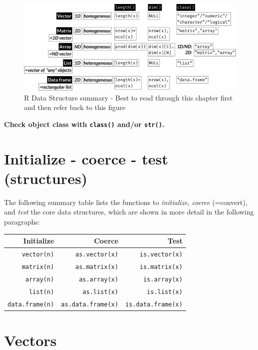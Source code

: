 \documentclass[
]{book}
\begin{document}
\begin{figure}

{\centering \includegraphics[width=1\linewidth]{./R_datastructures} 

}

\caption{R Data Structure summary - Best to read through this chapter first and then refer back to this figure}\label{fig:FigRDataStructures}
\end{figure}

\begin{rmdtip}
\textbf{Check object class with \texttt{class()} and/or \texttt{str()}.}
\end{rmdtip}

\hypertarget{initialize---coerce---test-structures}{%
\section{Initialize - coerce - test (structures)}\label{initialize---coerce---test-structures}}

The following summary table lists the functions to \emph{initialize}, \emph{coerce} (=convert), and \emph{test} the core data structures, which are shown in more detail in the following paragraphs:

\begin{longtable}[]{@{}rrr@{}}
\toprule
\textbf{Initialize} & \textbf{Coerce} & \textbf{Test}\tabularnewline
\midrule
\endhead
\texttt{vector(n)} & \texttt{as.vector(x)} & \texttt{is.vector(x)}\tabularnewline
\texttt{matrix(n)} & \texttt{as.matrix(x)} & \texttt{is.matrix(x)}\tabularnewline
\texttt{array(n)} & \texttt{as.array(x)} & \texttt{is.array(x)}\tabularnewline
\texttt{list(n)} & \texttt{as.list(x)} & \texttt{is.list(x)}\tabularnewline
\texttt{data.frame(n)} & \texttt{as.data.frame(x)} & \texttt{is.data.frame(x)}\tabularnewline
\bottomrule
\end{longtable}

\hypertarget{vectors}{%
\section{Vectors}\label{vectors}}
\end{document}
